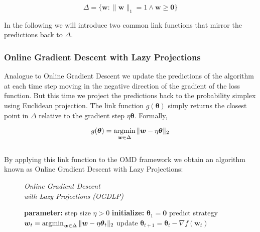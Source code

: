 \begin{equation*}
    \Delta = \{\boldsymbol{w}: \|\boldsymbol{w}\|_1 = 1 \land \boldsymbol{w} \ge \boldsymbol{0}\}
\end{equation*}

In the following we will introduce two common link functions that mirror the predictions back to $\Delta$. 

\subsubsection{Online Gradient Descent with Lazy Projections}\label{subsubsection:OnlineGradientDescentWithLazyProjections}

Analogue to Online Gradient Descent we update the predictions of the algorithm at each time step moving in the negative direction of the gradient of the loss function. But this time we project the predictions back to the probability simplex using Euclidean projection. The link function $g(\boldsymbol{\theta})$ simply returns the closest point in $\Delta$ relative to the gradient step $\eta\boldsymbol{\theta}$. Formally, 

\begin{equation*}
    g(\boldsymbol{\theta}) = \operatorname*{\arg\!\min}_{\boldsymbol{w} \in \Delta} \|\boldsymbol{w} - \eta\boldsymbol{\theta}\|_2
\end{equation*} \\

By applying this link function to the OMD framework we obtain an algorithm known as Online Gradient Descent with Lazy Projections:

\begin{figure}[H]\centering
    \textit{Online Gradient Descent \\ with Lazy Projections (OGDLP)} 
    \begin{minipage}{.7\linewidth}
        \begin{algorithm}[H]
        \DontPrintSemicolon
        \textbf{parameter: } step size $\eta > 0$ \;
        \textbf{initialize: } $\boldsymbol{\theta}_1 = \boldsymbol{0}$ \;
         {
        predict strategy $\boldsymbol{w}_t = \operatorname*{\arg\!\min}_{\boldsymbol{w} \in \Delta} \|\boldsymbol{w} - \eta\boldsymbol{\theta}_t\|_2$ \;
        update $\boldsymbol{\theta}_{t+1} = \boldsymbol{\theta}_t - \nabla f(\boldsymbol{w}_t)$ \;
        }
        \end{algorithm}\caption*{}
  \end{minipage}
\end{figure}

